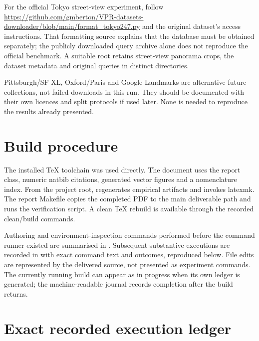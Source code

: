 For the official Tokyo street-view experiment, follow \url{https://github.com/gmberton/VPR-datasets-downloader/blob/main/format_tokyo247.py} and the original dataset's access instructions. That formatting source explains that the database must be obtained separately; the publicly downloaded query archive alone does not reproduce the official benchmark. A suitable root retains street-view panorama crops, the dataset metadata and original queries in distinct directories.

Pittsburgh/SF-XL, Oxford/Paris and Google Landmarks are alternative future collections, not failed downloads in this run. They should be documented with their own licences and split protocols if used later. None is needed to reproduce the results already presented.
\fi

\section{Build procedure}
The installed TeX toolchain was used directly. The document uses the report class, numeric natbib citations, generated vector figures and a nomenclature index. From the project root,  regenerates empirical artifacts and invokes latexmk. The report Makefile copies the completed PDF to the main deliverable path and runs the verification script. A clean TeX rebuild is available through the recorded clean/build commands.

Authoring and environment-inspection commands performed before the command runner existed are summarised in . Subsequent substantive executions are recorded in  with exact command text and outcomes\ifFullReport{}, reproduced below\fi. File edits are represented by the delivered source, not presented as experiment commands. \ifFullReport The currently running build can appear as in progress when its own ledger is generated; the machine-readable journal records completion after the build returns.\fi

\ifFullReport
\section{Exact recorded execution ledger}

\fi

